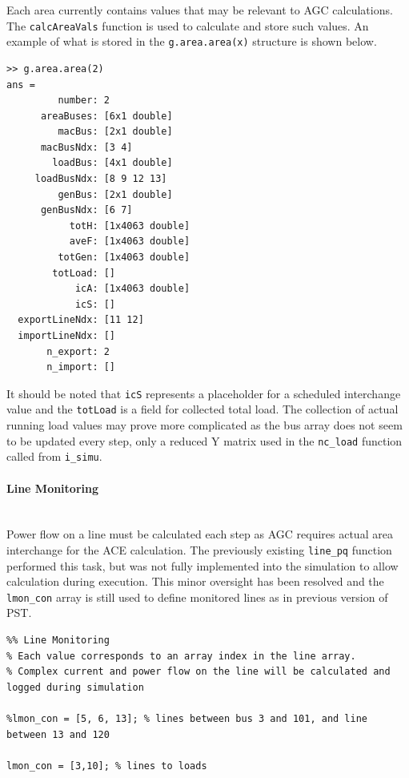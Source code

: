 \documentclass[12pt]{article}
\begin{document}
Each area currently contains values that may be relevant to AGC calculations.
The \verb|calcAreaVals| function is used to calculate and store such values.
An example of what is stored in the \verb|g.area.area(x)| structure is shown below.
\begin{verbatim}
>> g.area.area(2)
ans = 
         number: 2
      areaBuses: [6x1 double]
         macBus: [2x1 double]
      macBusNdx: [3 4]
        loadBus: [4x1 double]
     loadBusNdx: [8 9 12 13]
         genBus: [2x1 double]
      genBusNdx: [6 7]
           totH: [1x4063 double]
           aveF: [1x4063 double]
         totGen: [1x4063 double]
        totLoad: []
            icA: [1x4063 double]
            icS: []
  exportLineNdx: [11 12]
  importLineNdx: []
       n_export: 2
       n_import: []
\end{verbatim}
It should be noted that \verb|icS| represents a placeholder for a scheduled interchange value and the \verb|totLoad|  is a field for collected total load.
The collection of actual running load values may prove more complicated as the bus array does not seem to be updated every step, only a reduced Y matrix used in the \verb|nc_load| function called from \verb|i_simu|. 
 
 \pagebreak
\paragraph{Line Monitoring} \ \\
Power flow on a line must be calculated each step as AGC requires actual area interchange for the ACE calculation.
The previously existing \verb|line_pq| function performed this task, but was not fully implemented into the simulation to allow calculation during execution.
This minor oversight has been resolved and the \verb|lmon_con| array is still used to define monitored lines as in previous version of PST.

\begin{verbatim}
%% Line Monitoring
% Each value corresponds to an array index in the line array.
% Complex current and power flow on the line will be calculated and logged during simulation

%lmon_con = [5, 6, 13]; % lines between bus 3 and 101, and line between 13 and 120

lmon_con = [3,10]; % lines to loads
\end{verbatim}
\end{document}
